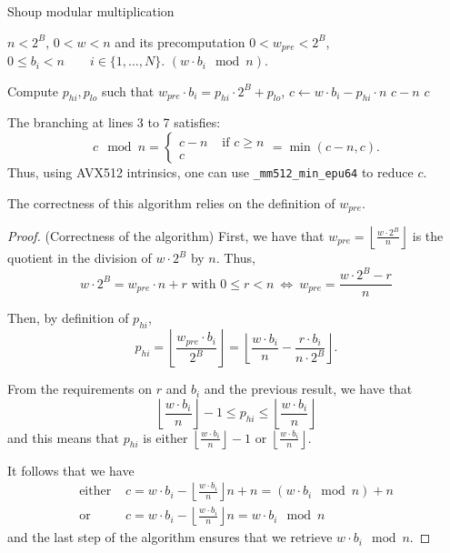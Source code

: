 \documentclass[a4paper]{article}
\begin{document}
\begin{algorithm}
    \caption{Shoup modular multiplication}
    \begin{algorithmic}[1]
        \Require $n < 2^B$,
        \Require $0 < w < n$ and its precomputation $0 < w_{pre} < 2^B$,
        \Require $0 \leq b_i < n \qquad i\in \{1, \dots, N\}$.
        \Ensure $(w\cdot b_i \mod n)$.

        \State Compute $p_{hi}, p_{lo}$ such that $w_{pre} \cdot b_i = p_{hi}\cdot 2^B + p_{lo}$, 
        \State $c \gets w\cdot b_i - p_{hi}\cdot n$ 
            \State \Return $c-n$
        \Else
            \State \Return $c$
        \EndIf
    \end{algorithmic}
\end{algorithm}

\begin{remark}
    The branching at lines 3 to 7 satisfies:
    \[
    c \mod n = 
    \left\{
        \begin{array}{ll}
            c - n & \text{ if } c \geq n \\
            c & 
        \end{array}
    \right.
    = \min(c-n, c).
    \]
    Thus, using AVX512 intrinsics, one can use \texttt{\_mm512\_min\_epu64} to reduce $c$.
\end{remark}

\bigskip
The correctness of this algorithm relies on the definition of $w_{pre}$. 

\begin{proof} (Correctness of the algorithm)
First, we have that $w_{pre}= \left\lfloor\frac{w\cdot 2^B}{n}\right\rfloor $ is the quotient in the division 
of $w\cdot 2^B$ by $n$. Thus,
\[
    w\cdot 2^B = w_{pre}\cdot n + r \text{ with } 0 \leq r < n\ \Longleftrightarrow\ w_{pre} = \dfrac{w\cdot 2^B - r}{n}
\]

Then, by definition of $p_{hi}$,
\[
p_{hi} = \left\lfloor\frac{w_{pre}\cdot b_i}{2^B}\right\rfloor
= \left\lfloor\dfrac{w\cdot b_i}{n} - \dfrac{r\cdot b_i}{n\cdot 2^B} \right\rfloor.
\]

From the requirements on $r$ and $b_i$ and the previous result, we have that
\[
\left\lfloor\dfrac{w\cdot b_i}{n}\right\rfloor - 1 \leq p_{hi} \leq \left\lfloor\dfrac{w\cdot b_i}{n}\right\rfloor
\]
and this means that $p_{hi}$ is either $\left\lfloor\frac{w\cdot b_i}{n}\right\rfloor - 1$ or $\left\lfloor\frac{w\cdot b_i}{n}\right\rfloor$.


It follows that we have
\begin{align*}
\text{either } &c=w\cdot b_i - \left\lfloor\frac{w\cdot b_i}{n}\right\rfloor n + n = (w\cdot b_i \mod n)+n \\
\text{or } &c=w\cdot b_i - \left\lfloor\frac{w\cdot b_i}{n}\right\rfloor n = w\cdot b_i \mod n
\end{align*}
and the last step of the algorithm ensures that we retrieve $w\cdot b_i \mod n$.
\end{proof}
\end{document}
